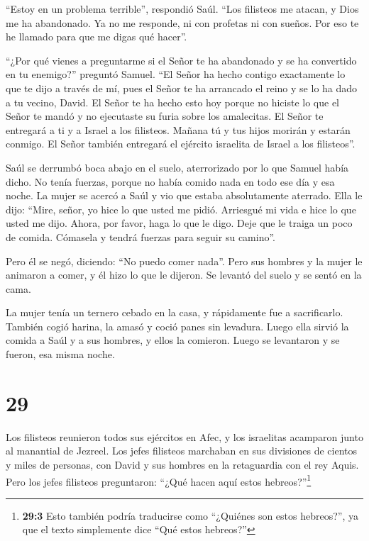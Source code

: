 ``Estoy en un problema terrible'', respondió Saúl. ``Los filisteos me
atacan, y Dios me ha abandonado. Ya no me responde, ni con profetas ni
con sueños. Por eso te he llamado para que me digas qué hacer''.

 ``¿Por qué vienes a preguntarme si el Señor te ha
abandonado y se ha convertido en tu enemigo?'' preguntó Samuel.
 ``El Señor ha hecho contigo exactamente lo que te dijo a
través de mí, pues el Señor te ha arrancado el reino y se lo ha dado a
tu vecino, David.  El Señor te ha hecho esto hoy porque no
hiciste lo que el Señor te mandó y no ejecutaste su furia sobre los
amalecitas.  El Señor te entregará a ti y a Israel a los
filisteos. Mañana tú y tus hijos morirán y estarán conmigo. El Señor
también entregará el ejército israelita de Israel a los filisteos''.

 Saúl se derrumbó boca abajo en el suelo, aterrorizado por
lo que Samuel había dicho. No tenía fuerzas, porque no había comido nada
en todo ese día y esa noche.  La mujer se acercó a Saúl y
vio que estaba absolutamente aterrado. Ella le dijo: ``Mire, señor, yo
hice lo que usted me pidió. Arriesgué mi vida e hice lo que usted me
dijo.  Ahora, por favor, haga lo que le digo. Deje que le
traiga un poco de comida. Cómasela y tendrá fuerzas para seguir su
camino''.

 Pero él se negó, diciendo: ``No puedo comer nada''. Pero
sus hombres y la mujer le animaron a comer, y él hizo lo que le dijeron.
Se levantó del suelo y se sentó en la cama.

 La mujer tenía un ternero cebado en la casa, y rápidamente
fue a sacrificarlo. También cogió harina, la amasó y coció panes sin
levadura.  Luego ella sirvió la comida a Saúl y a sus
hombres, y ellos la comieron. Luego se levantaron y se fueron, esa misma
noche.

\hypertarget{section-28}{%
\section{29}\label{section-28}}

 Los filisteos reunieron todos sus ejércitos en Afec, y los
israelitas acamparon junto al manantial de Jezreel.  Los
jefes filisteos marchaban en sus divisiones de cientos y miles de
personas, con David y sus hombres en la retaguardia con el rey Aquis.
 Pero los jefes filisteos preguntaron: ``¿Qué hacen aquí
estos hebreos?''\footnote{\textbf{29:3} Esto también podría traducirse
  como ``¿Quiénes son estos hebreos?'', ya que el texto simplemente dice
  ``Qué estos hebreos?''}

